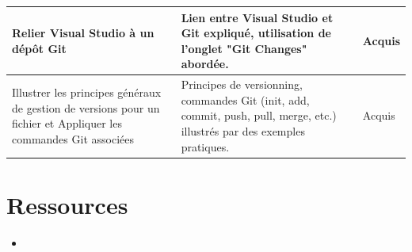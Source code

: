 \begin{center}
\begin{tabular}{|p{}|p{}|m{}|}
Relier Visual Studio à un dépôt Git &
Lien entre Visual Studio et Git expliqué, utilisation de l'onglet "Git Changes" abordée. &
{\color{green!60!black}Acquis} \\ \hline

Illustrer les principes généraux de gestion de versions pour un fichier et Appliquer les commandes Git associées &
Principes de versionning, commandes Git (init, add, commit, push, pull, merge, etc.) illustrés par des exemples pratiques. &
{\color{green!60!black}Acquis} \\ \hline

\end{tabular}
\end{center}

\section*{Ressources}

\begin{itemize}
	\item 
\end{itemize}
